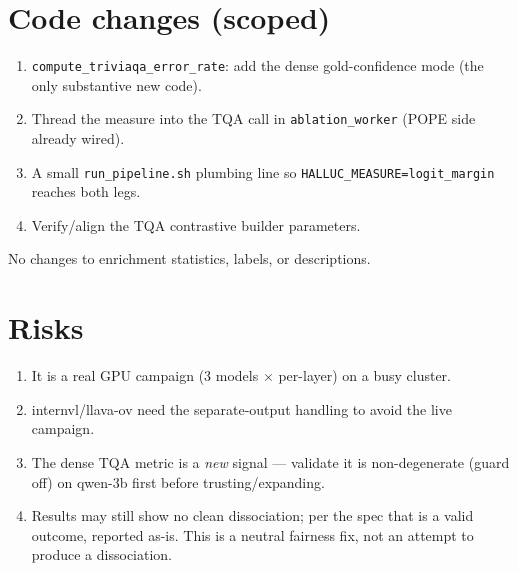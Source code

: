 \documentclass[11pt,a4paper]{article}
\newcommand{\code}[1]{\texttt{#1}}
\begin{document}
\section{Code changes (scoped)}
\begin{enumerate}[nosep]
\item \code{compute\_triviaqa\_error\_rate}: add the dense gold-confidence mode (the only
substantive new code).
\item Thread the measure into the TQA call in \code{ablation\_worker} (POPE side already
wired).
\item A small \code{run\_pipeline.sh} plumbing line so \code{HALLUC\_MEASURE=logit\_margin}
reaches both legs.
\item Verify/align the TQA contrastive builder parameters.
\end{enumerate}
No changes to enrichment statistics, labels, or descriptions.

\section{Risks}
\begin{enumerate}[nosep]
\item It is a real GPU campaign (3 models $\times$ per-layer) on a busy cluster.
\item internvl/llava-ov need the separate-output handling to avoid the live campaign.
\item The dense TQA metric is a \emph{new} signal --- validate it is non-degenerate
(guard off) on qwen-3b first before trusting/expanding.
\item Results may still show no clean dissociation; per the spec that is a valid outcome,
reported as-is. This is a neutral fairness fix, not an attempt to produce a dissociation.
\end{enumerate}
\end{document}
